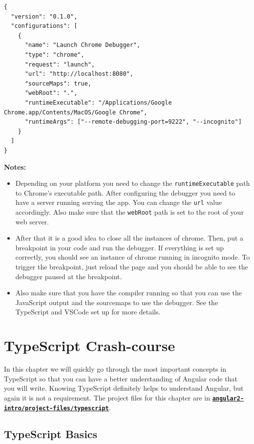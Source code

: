 \documentclass[12pt,]{article}
\begin{document}
\begin{verbatim}
{
  "version": "0.1.0",
  "configurations": [
    {
      "name": "Launch Chrome Debugger",
      "type": "chrome",
      "request": "launch",
      "url": "http://localhost:8080",
      "sourceMaps": true,
      "webRoot": ".",
      "runtimeExecutable": "/Applications/Google Chrome.app/Contents/MacOS/Google Chrome",
      "runtimeArgs": ["--remote-debugging-port=9222", "--incognito"]
    }
  ]
}
\end{verbatim}

\textbf{Notes:}

\begin{itemize}
\item
  Depending on your platform you need to change the
  \texttt{runtimeExecutable} path to Chrome's executable path. After
  configuring the debugger you need to have a server running serving the
  app. You can change the \texttt{url} value accordingly. Also make sure
  that the \texttt{webRoot} path is set to the root of your web server.
\item
  After that it is a good idea to close all the instances of chrome.
  Then, put a breakpoint in your code and run the debugger. If
  everything is set up correctly, you should see an instance of chrome
  running in incognito mode. To trigger the breakpoint, just reload the
  page and you should be able to see the debugger paused at the
  breakpoint.
\item
  Also make sure that you have the compiler running so that you can use
  the JavaScript output and the sourcemaps to use the debugger. See the
  TypeScript and VSCode set up for more details.
\end{itemize}

\section{TypeScript Crash-course}\label{typescript-crash-course}

In this chapter we will quickly go through the most important concepts
in TypeScript so that you can have a better understanding of Angular
code that you will write. Knowing TypeScript definitely helps to
understand Angular, but again it is not a requirement. The project files
for this chapter are in
\href{https://github.com/st32lth/angular2-intro/tree/master/project-files/typescript}{\textbf{\texttt{angular2-intro/project-files/typescript}}}.

\subsection{TypeScript Basics}\label{typescript-basics}
\end{document}
